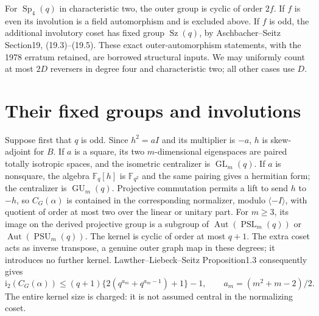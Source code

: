 \documentclass[10pt]{article}
\newcommand{\ii}{\mathrm i_2}\newcommand{\nuu}{\nu_2}\newcommand{\F}{\mathbb F}\newcommand{\GL}{\operatorname{GL}}\newcommand{\GU}{\operatorname{GU}}\newcommand{\Sp}{\operatorname{Sp}}\newcommand{\PSp}{\operatorname{PSp}}\newcommand{\PGSp}{\operatorname{PGSp}}\newcommand{\Aut}{\operatorname{Aut}}
\begin{document}
For $\Sp_4(q)$ in characteristic two, the outer group is cyclic of order
$2f$. If $f$ is even its involution is a field automorphism and is excluded
above. If $f$ is odd, the additional involutory coset has fixed group
$\operatorname{Sz}(q)$, by Aschbacher--Seitz Section19, (19.3)--(19.5).
These exact outer-automorphism statements, with the 1978 erratum retained,
are borrowed structural inputs. We may uniformly count at most $2D$
reversers in degree four and characteristic two; all other cases use $D$.

\section{Their fixed groups and involutions}
Suppose first that $q$ is odd. Since $h^2=aI$ and its multiplier is $-a$,
$h$ is skew-adjoint for $B$. If $a$ is a square, its two $m$-dimensional
eigenspaces are paired totally isotropic spaces, and the isometric
centralizer is $\GL_m(q)$. If $a$ is nonsquare, the algebra $\F_q[h]$ is
$\F_{q^2}$ and the same pairing gives a hermitian form; the centralizer is
$\GU_m(q)$. Projective commutation permits a lift to send $h$ to $-h$,
so $C_G(\alpha)$ is contained in the corresponding normalizer, modulo
$\langle-I\rangle$, with quotient of order at most two over the linear or
unitary part. For $m\ge3$, its image on the derived projective group is a
subgroup of $\Aut(\operatorname{PSL}_m(q))$ or
$\Aut(\operatorname{PSU}_m(q))$. The kernel is cyclic of order at most
$q+1$. The extra coset acts as inverse transpose, a genuine outer graph
map in these degrees; it introduces no further kernel.
Lawther--Liebeck--Seitz Proposition1.3 consequently gives
\begin{equation}\label{oddmu}
 \ii(C_G(\alpha))\le (q+1)\{2(q^{a_m}+q^{a_m-1})+1\}-1,
 \qquad a_m=(m^2+m-2)/2.
\end{equation}
The entire kernel size is charged: it is not assumed central in the
normalizing coset.
\end{document}
